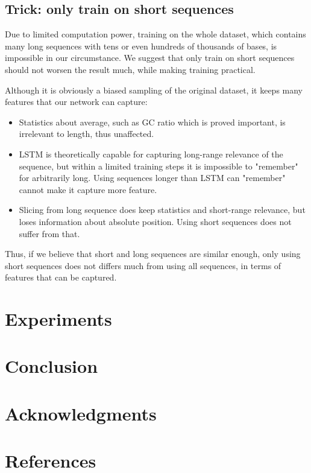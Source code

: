 \documentclass[10pt,a4paper]{article}
\begin{document}
\begin{spacing}{1.5}
\subsection{Trick: only train on short sequences}
\par Due to limited computation power, training on the whole dataset, which contains many long sequences with tens or even hundreds of thousands of bases, is impossible in our circumstance. We suggest that only train on short sequences should not worsen the result much, while making training practical.
\par Although it is obviously a biased sampling of the original dataset, it keeps many features that our network can capture:
\begin{itemize}
\item Statistics about average, such as GC ratio which is proved important, is irrelevant to length, thus unaffected.
\item LSTM is theoretically capable for capturing long-range relevance of the sequence, but within a limited training steps it is impossible to "remember" for arbitrarily long. Using sequences longer than LSTM can "remember" cannot make it capture more feature.
\item Slicing from long sequence does keep statistics and short-range relevance, but loses information about absolute position. Using short sequences does not suffer from that.
\end{itemize}
Thus, if we believe that short and long sequences are similar enough, only using short sequences does not differs much from using all sequences, in terms of features that can be captured. 
\section{Experiments}

\section{Conclusion}

\section*{Acknowledgments}

\newpage

\section*{References}

\end{spacing}
\end{document}
